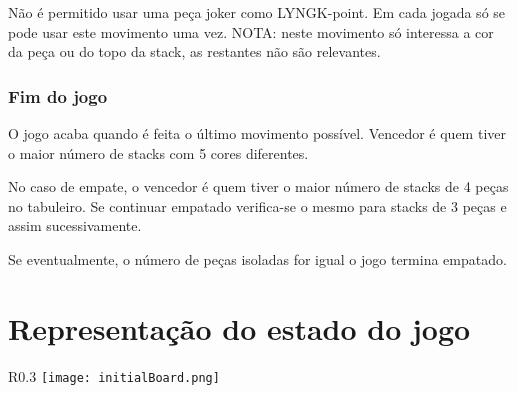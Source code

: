 \documentclass[a4paper]{article}
\begin{document}
Não é permitido usar uma peça joker como LYNGK-point.
Em cada jogada só se pode usar este movimento uma vez.
NOTA: neste movimento só interessa a cor da peça ou do topo da stack, as restantes não são relevantes.

\subsubsection{Fim do jogo}

O jogo acaba quando é feita o último movimento possível. Vencedor é quem tiver o maior número de stacks com 5 cores diferentes.

No caso de empate, o vencedor é quem tiver o maior número de stacks de 4 peças no tabuleiro. Se continuar empatado verifica-se o mesmo para stacks de 3 peças e assim sucessivamente.

Se eventualmente, o número de peças isoladas for igual o jogo termina empatado.


\section{Representação do estado do jogo}

\small
\lstset{language=Prolog}

\normalsize

\begin{wrapfigure}{R}{0.3\textwidth}
\texttt{[image: initialBoard.png]}
\caption{\label{fig:initialBoard} }
\end{wrapfigure}
\end{document}
